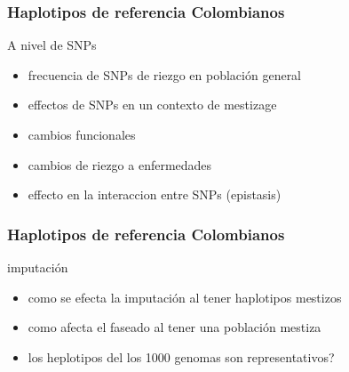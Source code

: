 \documentclass{beamer}\usepackage[]{graphicx}\usepackage[]{color}
\begin{document}
\begin{frame}[fragile]
\frametitle{Haplotipos de referencia Colombianos}
A nivel de SNPs
\begin{itemize}
\item  frecuencia de SNPs de riezgo en poblaci\'on general
\item  effectos de SNPs en un contexto de mestizage
\item  cambios funcionales
\item  cambios de riezgo a enfermedades
\item  effecto en la interaccion entre SNPs (epistasis)
\end{itemize}
\end{frame}


\begin{frame}[fragile]
\frametitle{Haplotipos de referencia Colombianos}

imputaci\'on
\begin{itemize}
\item  como se efecta la imputaci\'on al tener haplotipos mestizos
\item  como afecta el faseado al tener una poblaci\'on mestiza
\item  los heplotipos del los 1000 genomas son representativos? 
\end{itemize}
\end{frame}
\end{document}
